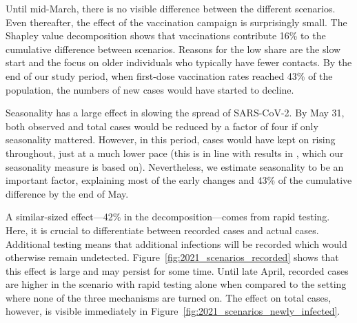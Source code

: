 \begin{figure}[!tp]
\end{figure}

Until mid-March, there is no visible difference between the different scenarios. Even
thereafter, the effect of the vaccination campaign is surprisingly small. The Shapley
value decomposition shows that vaccinations contribute 16\% to the cumulative difference
between scenarios. Reasons for the low share are the slow start and the focus on older
individuals who typically have fewer contacts. By the end of our study period, when
first-dose vaccination rates reached 43\% of the population, the numbers of new cases
would have started to decline.

Seasonality has a large effect in slowing the spread of SARS-CoV-2. By May 31, both
observed and total cases would be reduced by a factor of four if only seasonality
mattered. However, in this period, cases would have kept on rising throughout, just at a
much lower pace (this is in line with results in \cite{Gavenciak2021}, which our
seasonality measure is based on). Nevertheless, we estimate seasonality to be an
important factor, explaining most of the early changes and 43\% of the cumulative
difference by the end of May.

A similar-sized effect---42\% in the decomposition---comes from rapid testing. Here, it
is crucial to differentiate between recorded cases and actual cases. Additional testing
means that additional infections will be recorded which would otherwise remain
undetected. Figure~\ref{fig:2021_scenarios_recorded} shows that this effect is large and
may persist for some time. Until late April, recorded cases are higher in the scenario
with rapid testing alone when compared to the setting where none of the three mechanisms
are turned on. The effect on total cases, however, is visible immediately in
Figure~\ref{fig:2021_scenarios_newly_infected}.

